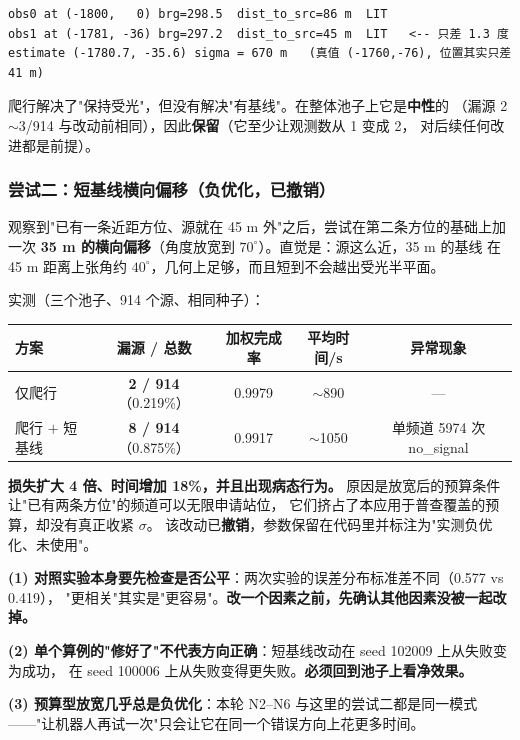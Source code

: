 \begin{lstlisting}[caption={爬行后的实测（seed 100006）}]
obs0 at (-1800,   0) brg=298.5  dist_to_src=86 m  LIT
obs1 at (-1781, -36) brg=297.2  dist_to_src=45 m  LIT   <-- 只差 1.3 度
estimate (-1780.7, -35.6) sigma = 670 m   (真值 (-1760,-76), 位置其实只差 41 m)
\end{lstlisting}

爬行解决了"保持受光"，但没有解决"有基线"。在整体池子上它是\textbf{中性}的
（漏源 2$\sim$3/914 与改动前相同），因此\textbf{保留}（它至少让观测数从 1 变成 2，
对后续任何改进都是前提）。

\subsubsection{尝试二：短基线横向偏移（\textbf{负优化，已撤销}）}

观察到"已有一条近距方位、源就在 45 m 外"之后，尝试在第二条方位的基础上加一次
\textbf{35 m 的横向偏移}（角度放宽到 $70^{\circ}$）。直觉是：源这么近，35 m 的基线
在 45 m 距离上张角约 $40^{\circ}$，几何上足够，而且短到不会越出受光半平面。

实测（三个池子、914 个源、相同种子）：

\begin{center}
\begin{tabular}{lcccc}
\toprule
方案 & 漏源 / 总数 & 加权完成率 & 平均时间/s & 异常现象 \\ \midrule
仅爬行 & \textbf{2 / 914}（0.219\%） & 0.9979 & $\sim$890 & --- \\
爬行 $+$ 短基线 & \textbf{8 / 914}（0.875\%） & 0.9917 & $\sim$1050 & 单频道 5974 次 no\_signal \\
\bottomrule
\end{tabular}
\end{center}

\textbf{损失扩大 4 倍、时间增加 18\%，并且出现病态行为。}
原因是放宽后的预算条件让"已有两条方位"的频道可以无限申请站位，
它们挤占了本应用于普查覆盖的预算，却没有真正收紧 $\sigma$。
该改动已\textbf{撤销}，参数保留在代码里并标注为"实测负优化、未使用"。

\begin{warnbox}[title=这一节的三个可复用教训]
\textbf{(1) 对照实验本身要先检查是否公平}：两次实验的误差分布标准差不同（0.577 vs 0.419），
"更相关"其实是"更容易"。\textbf{改一个因素之前，先确认其他因素没被一起改掉。}\par
\textbf{(2) 单个算例的"修好了"不代表方向正确}：短基线改动在 seed 102009 上从失败变为成功，
在 seed 100006 上从失败变得更失败。\textbf{必须回到池子上看净效果。}\par
\textbf{(3) 预算型放宽几乎总是负优化}：本轮 N2--N6 与这里的尝试二都是同一模式
——"让机器人再试一次"只会让它在同一个错误方向上花更多时间。
\end{warnbox}

